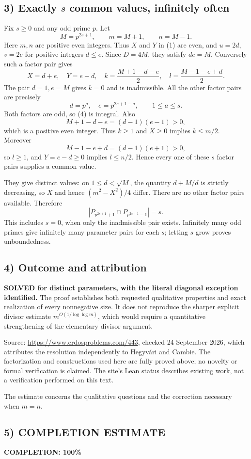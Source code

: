 \subsection*{3) Exactly $s$ common values, infinitely often}
Fix $s\ge0$ and any odd prime $p$. Let
\[M=p^{2s+1},\qquad m=M+1,\qquad n=M-1.\]
Here $m,n$ are positive even integers. Thus $X$ and $Y$ in (1) are even, and $u=2d$, $v=2e$ for positive integers $d\le e$. Since $D=4M$, they satisfy $de=M$. Conversely such a factor pair gives
\[X=d+e,\quad Y=e-d,\quad
k=\frac{M+1-d-e}{2},\quad l=\frac{M-1-e+d}{2}.\tag{4}\]
The pair $d=1,e=M$ gives $k=0$ and is inadmissible. All the other factor pairs are precisely
\[d=p^a,\quad e=p^{2s+1-a},\qquad 1\le a\le s.\]
Both factors are odd, so (4) is integral. Also
\[M+1-d-e=(d-1)(e-1)>0,\]
which is a positive even integer. Thus $k\ge1$ and $X\ge0$ implies $k\le m/2$. Moreover
\[M-1-e+d=(d-1)(e+1)>0,
\]
so $l\ge1$, and $Y=e-d\ge0$ implies $l\le n/2$. Hence every one of these $s$ factor pairs supplies a common value.

They give distinct values: on $1\le d<\sqrt M$, the quantity $d+M/d$ is strictly decreasing, so $X$ and hence $(m^2-X^2)/4$ differ. There are no other factor pairs available. Therefore
\[|P_{p^{2s+1}+1}\cap P_{p^{2s+1}-1}|=s.\tag{5}\]
This includes $s=0$, when only the inadmissible pair exists. Infinitely many odd primes give infinitely many parameter pairs for each $s$; letting $s$ grow proves unboundedness.

\subsection*{4) Outcome and attribution}
\textbf{SOLVED for distinct parameters, with the literal diagonal exception identified.} The proof establishes both requested qualitative properties and exact realization of every nonnegative size. It does not reproduce the sharper explicit divisor estimate $m^{O(1/\log\log m)}$, which would require a quantitative strengthening of the elementary divisor argument.

Source: \url{https://www.erdosproblems.com/443}, checked 24 September 2026, which attributes the resolution independently to Hegyv\'ari and Cambie. The factorization and constructions used here are fully proved above; no novelty or formal verification is claimed. The site's Lean status describes existing work, not a verification performed on this text.

The estimate concerns the qualitative questions and the correction necessary when $m=n$.
\subsection*{5) COMPLETION ESTIMATE}
\textbf{COMPLETION: 100\%}
